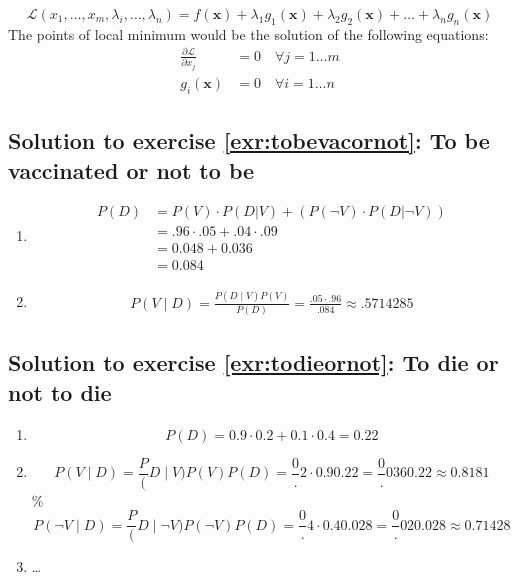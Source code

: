 \documentclass[
  12pt,
  oneside]{book}
\providecommand{\tightlist}{%
  \setlength{\itemsep}{0pt}\setlength{\parskip}{0pt}}
\theoremstyle{definition}
\theoremstyle{definition}
\theoremstyle{definition}
\theoremstyle{definition}
\theoremstyle{remark}
\begin{document}
\[
\mathcal{L}(x_1, \dots, x_m, \lambda_i, \dots, \lambda_n)=f(\mathbf{x})+\lambda_1 g_1(\mathbf{x})+\lambda_2 g_2(\mathbf{x})+\ldots+\lambda_n g_n(\mathbf{x})
\]
The points of local minimum would be the solution of the following equations:
\begin{align*}
    \frac{\partial \mathcal{L}}{\partial x_{j}} &=0 \quad \forall j=1 \dots m \\
    g_i(\mathbf{x}) &=0 \quad \forall i=1\dots n
\end{align*}

\hypertarget{sol:tobevacornot}{%
\subsection*{Solution to exercise \ref{exr:tobevacornot}: To be vaccinated or not to be}\label{sol:tobevacornot}}

\begin{enumerate}
\def\labelenumi{\alph{enumi})}
\tightlist
\item
  \begin{align*}
            P(D)&=P(V)\cdot P(D|V)+(P(\neg V)\cdot P(D|\neg V))\\
            &= .96\cdot .05 + .04 \cdot .09\\
            &= 0.048 + 0.036 \\&= 0.084
  \end{align*}
\item
  \begin{align*}
  P(V \mid D)={\frac {P(D\mid V)P(V)}{P(D)}}= \frac{.05\cdot .96}{.084}\approx .5714285
  \end{align*}
\end{enumerate}

\hypertarget{sol:todieornot}{%
\subsection*{Solution to exercise \ref{exr:todieornot}: To die or not to die}\label{sol:todieornot}}

\begin{enumerate}
\def\labelenumi{\alph{enumi})}
\tightlist
\item
  \[P(D) = 0.9\cdot0.2+0.1\cdot0.4=0.22\]
\item
  \[P(V\mid D)=\frac P(D\mid V)P(V)P(D)=\frac0.2\cdot 0.90.22=\frac0.0360.22\approx0.8181\]
  \% \[P(\neg V\mid D)=\frac P(D\mid \neg V)P(\neg V)P(D)=\frac0.4\cdot 0.40.028=\frac0.020.028\approx0.71428\]
\item
  \ldots{}
\end{enumerate}
\end{document}
